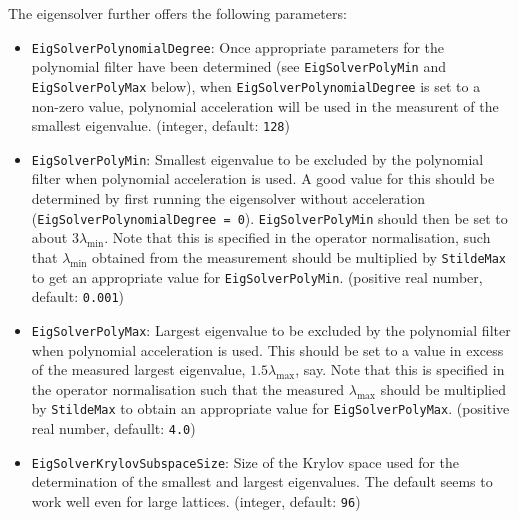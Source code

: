 The eigensolver further offers the following parameters:
\begin{itemize}
  \item{ \texttt{EigSolverPolynomialDegree}: Once appropriate parameters for the polynomial filter have been determined (see \texttt{EigSolverPolyMin} and \texttt{EigSolverPolyMax} below), when \texttt{EigSolverPolynomialDegree} is set to a non-zero value, polynomial acceleration will be used in the measurent of the smallest eigenvalue. (integer, default: \texttt{128}) }
  \item{ \texttt{EigSolverPolyMin}: Smallest eigenvalue to be excluded by the polynomial filter when polynomial acceleration is used. A good value for this should be determined by first running the eigensolver without acceleration (\texttt{EigSolverPolynomialDegree = 0}). \texttt{EigSolverPolyMin} should then be set to about $3\lambda_\mathrm{min}$. Note that this is specified in the operator normalisation, such that $\lambda_\mathrm{min}$ obtained from the measurement should be multiplied by \texttt{StildeMax} to get an appropriate value for \texttt{EigSolverPolyMin}.  (positive real number, default: \texttt{0.001})}
  \item{ \texttt{EigSolverPolyMax}: Largest eigenvalue to be excluded by the polynomial filter when polynomial acceleration is used. This should be set to a value in excess of the measured largest eigenvalue, $1.5\lambda_\mathrm{max}$, say. Note that this is specified in the operator normalisation such that the measured $\lambda_\mathrm{max}$ should be multiplied by \texttt{StildeMax} to obtain an appropriate value for \texttt{EigSolverPolyMax}. (positive real number, defaullt: \texttt{4.0})}
  \item{ \texttt{EigSolverKrylovSubspaceSize}: Size of the Krylov space used for the determination of the smallest and largest eigenvalues. The default seems to work well even for large lattices. (integer, default: \texttt{96})}
\end{itemize}


